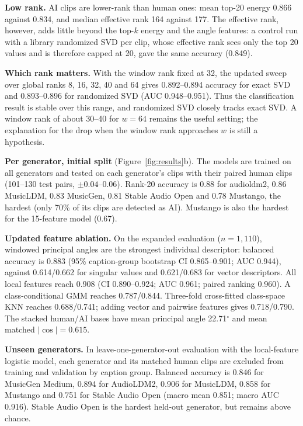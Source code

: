 \documentclass[11pt,a4paper]{article}
\theoremstyle{plain}
\theoremstyle{definition}
\theoremstyle{remark}
\begin{document}
\textbf{Low rank.} AI clips are lower-rank than human ones: mean top-20 energy
0.866 against 0.834, and median effective rank 164 against 177. The effective
rank, however, adds little beyond the top-$k$ energy and the angle features: a
control run with a library randomized SVD per clip, whose effective rank sees
only the top 20 values and is therefore capped at 20, gave the same accuracy
(0.849).


\textbf{Which rank matters.} With the window rank fixed at 32, the updated
sweep over global ranks 8, 16, 32, 40 and 64 gives 0.892--0.894 accuracy for
exact SVD and 0.893--0.896 for randomized SVD (AUC 0.948--0.951). Thus the
classification result is stable over this range, and randomized SVD closely
tracks exact SVD. A window rank of about 30--40 for $w=64$ remains the useful
setting; the explanation for the drop when the window rank approaches $w$
is still a hypothesis.

\textbf{Per generator, initial split} (Figure~\ref{fig:results}b). The models are trained on all generators and tested on
each generator's clips with their paired human clips (101--130 test pairs,
$\pm0.04$--$0.06$). Rank-20 accuracy is 0.88 for audioldm2, 0.86 MusicLDM,
0.83 MusicGen, 0.81 Stable Audio Open and 0.78 Mustango, the hardest (only 70\%
of its clips are detected as AI). Mustango is also the hardest for the
15-feature model (0.67).

\textbf{Updated feature ablation.} On the expanded evaluation ($n=1{,}110$),
windowed principal angles are the strongest individual descriptor: balanced
accuracy is 0.883 (95\% caption-group bootstrap CI 0.865--0.901; AUC 0.944),
against 0.614/0.662 for singular values and 0.621/0.683 for vector descriptors.
All local features reach 0.908 (CI 0.890--0.924; AUC 0.961; paired ranking
0.960). A class-conditional GMM reaches 0.787/0.844. Three-fold cross-fitted
class-space KNN reaches 0.688/0.741; adding vector and pairwise features gives
0.718/0.790. The stacked human/AI bases have mean principal angle
22.71$^\circ$ and mean matched $|\cos|=0.615$.

\textbf{Unseen generators.} In leave-one-generator-out evaluation with the local-feature logistic model, each
generator and its matched human clips are excluded from training and
validation by caption group. Balanced accuracy is 0.846 for MusicGen Medium,
0.894 for AudioLDM2, 0.906 for MusicLDM, 0.858 for Mustango and 0.751 for
Stable Audio Open (macro mean 0.851; macro AUC 0.916). Stable Audio Open is the
hardest held-out generator, but remains above chance.
\end{document}
